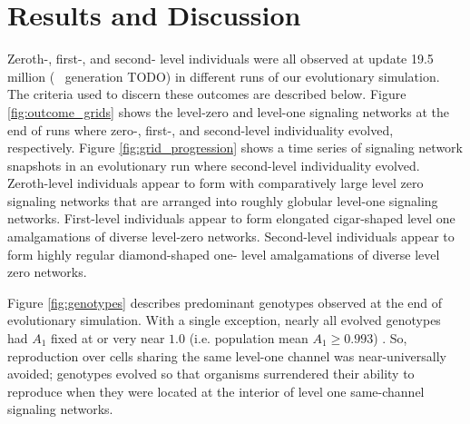 \section{Results and Discussion}













Zeroth-, first-, and second- level individuals were all observed at update 19.5 million (~ generation TODO) in different runs of our evolutionary simulation.
The criteria used to discern these outcomes are described below.
Figure \ref{fig:outcome_grids} shows the level-zero and level-one signaling networks at the end of runs where zero-, first-, and second-level individuality evolved, respectively.
Figure \ref{fig:grid_progression} shows a time series of signaling network snapshots in an evolutionary run where second-level individuality evolved.
Zeroth-level individuals appear to form with comparatively large level zero signaling networks that are arranged into roughly globular level-one signaling networks.
First-level individuals appear to form elongated cigar-shaped level one amalgamations of diverse level-zero networks.
Second-level individuals appear to form highly regular diamond-shaped one- level amalgamations of diverse level zero networks.

Figure \ref{fig:genotypes} describes predominant genotypes observed at the end of evolutionary simulation.
With a single exception, nearly all evolved genotypes had $A_1$ fixed at or very near $1.0$ (i.e. population mean $A_1 \geq 0.993$) .
So, reproduction over cells sharing the same level-one channel was near-universally avoided;
genotypes evolved so that organisms surrendered their ability to reproduce when they were located at the interior of level one same-channel signaling networks. %

